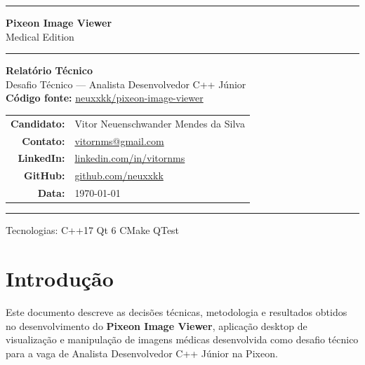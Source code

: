 \documentclass[12pt, a4paper]{article}
\begin{document}
\begin{titlepage}
  \centering
  \vspace*{2cm}

  {\color{pixeon}\rule{\linewidth}{2pt}}
  \vspace{0.4cm}

  {\Huge\bfseries\color{pixeon} Pixeon Image Viewer}\\[0.3cm]
  {\Large\color{gray80} Medical Edition}

  \vspace{0.3cm}
  {\color{pixeon}\rule{\linewidth}{2pt}}

  \vspace{1.5cm}
  {\large\bfseries Relatório Técnico}\\[0.2cm]
  {\normalsize Desafio Técnico --- Analista Desenvolvedor C++ Júnior}\\
  {\normalsize \textbf{Código fonte: }\href{https://github.com/neuxxkk/pixeon-image-viewer}{ neuxxkk/pixeon-image-viewer} }

  \vfill

  \begin{tabular}{rl}
    \textbf{Candidato:}  & Vitor Neuenschwander Mendes da Silva \\[4pt]
    \textbf{Contato:}    & \href{mailto:vitornms@gmail.com}{vitornms@gmail.com} \\[4pt]
    \textbf{LinkedIn:}   & \href{https://linkedin.com/in/vitornms}{linkedin.com/in/vitornms} \\[4pt]
    \textbf{GitHub:}     & \href{https://github.com/neuxxkk}{github.com/neuxxkk} \\[4pt]
    \textbf{Data:}       & \today
  \end{tabular}

  \vspace{1.5cm}
  {\color{pixeon}\rule{\linewidth}{0.8pt}}
  \vspace{0.2cm}
  {\small\color{gray80}
    Tecnologias: C++17 \textbullet{} Qt 6 \textbullet{} CMake \textbullet{} QTest
  }
\end{titlepage}

\tableofcontents
\newpage

\section{Introdução}

Este documento descreve as decisões técnicas, metodologia e resultados obtidos
no desenvolvimento do \textbf{Pixeon Image Viewer}, aplicação desktop de
visualização e manipulação de imagens médicas desenvolvida como desafio técnico
para a vaga de Analista Desenvolvedor C++ Júnior na Pixeon.
\end{document}
